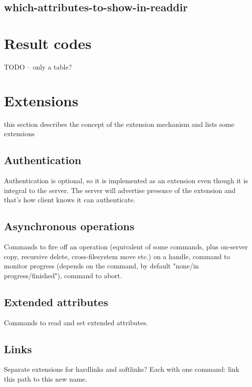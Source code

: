 \subsection{which-attributes-to-show-in-readdir}


\section{Result codes}

TODO -- only a table?


\section{Extensions}

this section describes the concept of the extension mechanism and lists some extensions

\subsection{Authentication}

Authentication is optional, so it is implemented as an extension even though it is integral to the server. The
server will advertise presence of the extension and that's how client knows it can authenticate.

\subsection{Asynchronous operations}

Commands to fire off an operation (equivalent of some commands, plus on-server copy, recursive delete,
cross-filesystem move etc.) on a handle, command to monitor progress (depends on the command, by default
"none/in progress/finished"), command to abort.

\subsection{Extended attributes}

Commands to read and set extended attributes.

\subsection{Links}

Separate extensions for hardlinks and softlinks? Each with one command: link this path to this new name.
